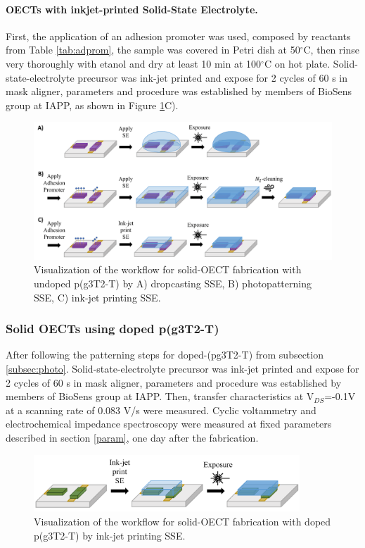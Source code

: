 \paragraph{OECTs with inkjet-printed Solid-State Electrolyte.}First, the application of an adhesion promoter was used, composed by reactants from Table \ref{tab:adprom}, the sample was covered in Petri dish at 50$^{\circ}$C, then rinse very thoroughly with etanol and dry at least 10 min at 100$^{\circ}$C on hot plate. Solid-state-electrolyte precursor was ink-jet printed and expose for 2 cycles of 60 s in mask aligner, parameters and procedure was established by members of BioSens group at IAPP, as shown in Figure \ref{fig:undopedsse}C). 

\begin{figure}[!ht]
	\centering
	\includegraphics[width=\textwidth]{Images/pdf/undoped-sse.pdf}
	\caption[Solid-OECT fabrication with undoped p(g3T2-T)]{Visualization of the workflow for solid-OECT fabrication with undoped p(g3T2-T) by A) dropcasting SSE, B) photopatterning SSE, C) ink-jet printing SSE.}
	\label{fig:undopedsse}
\end{figure}

\subsubsection{Solid OECTs using doped p(g3T2-T)}
After following the patterning steps for doped-(pg3T2-T) from subsection \ref{subsec:photo}. Solid-state-electrolyte precursor was ink-jet printed and expose for 2 cycles of 60 s in mask aligner, parameters and procedure was established by members of BioSens group at IAPP. Then, transfer characteristics at V$_{DS}$=-0.1V at a scanning rate of 0.083 V/s were measured. Cyclic voltammetry and electrochemical impedance spectroscopy were measured at fixed parameters described in section \ref{param}, one day after the fabrication.



\begin{figure}[!ht]
	\centering
	\includegraphics[width=10cm]{Images/pdf/doped-sse.pdf}
	\caption[Solid-OECT fabrication with doped p(g3T2-T)]{Visualization of the workflow for solid-OECT fabrication with doped p(g3T2-T) by ink-jet printing SSE.}
	\label{fig:dopedsse}
\end{figure}

